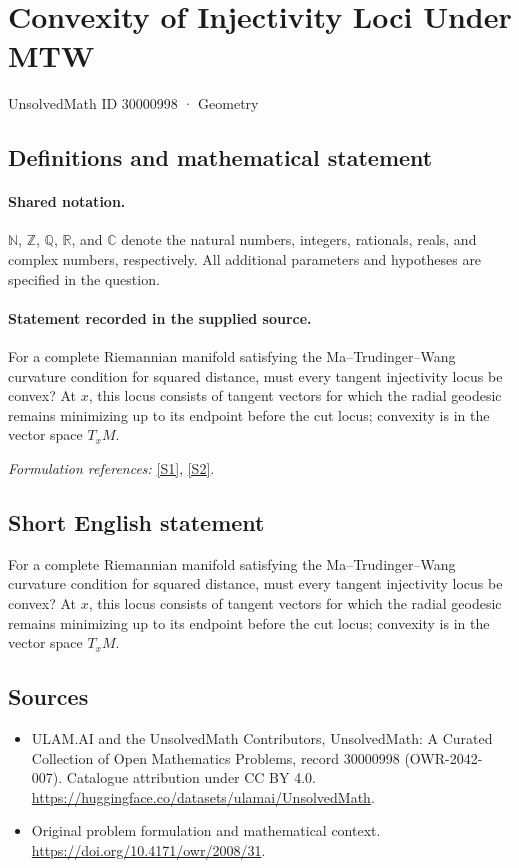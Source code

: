 \documentclass[11pt]{article}
\newcommand{\sref}[2]{\hyperlink{source:#1:#2}{[S#2]}}
\begin{document}
\setcounter{section}{30000997}
\section{Convexity of Injectivity Loci Under MTW}\label{30000998}
{\small UnsolvedMath ID 30000998 · Geometry}
\subsection{Definitions and mathematical statement}

\paragraph{Shared notation.}$\mathbb N$, $\mathbb Z$, $\mathbb Q$, $\mathbb R$, and $\mathbb C$ denote the natural numbers, integers, rationals, reals, and complex numbers, respectively. All additional parameters and hypotheses are specified in the question.


\paragraph{Statement recorded in the supplied source.}
For a complete Riemannian manifold satisfying the Ma--Trudinger--Wang curvature condition for squared distance, must every tangent injectivity locus be convex? At $x$, this locus consists of tangent vectors for which the radial geodesic remains minimizing up to its endpoint before the cut locus; convexity is in the vector space $T_xM$.
\par\smallskip\textit{Formulation references:} \sref{30000998}{1}, \sref{30000998}{2}.
\subsection{Short English statement}
For a complete Riemannian manifold satisfying the Ma--Trudinger--Wang curvature condition for squared distance, must every tangent injectivity locus be convex? At $x$, this locus consists of tangent vectors for which the radial geodesic remains minimizing up to its endpoint before the cut locus; convexity is in the vector space $T_xM$.
\subsection{Sources}
\begin{itemize}
\item[\hypertarget{source:30000998:1}{S1}] ULAM.AI and the UnsolvedMath Contributors, UnsolvedMath: A Curated Collection of Open Mathematics Problems, record 30000998 (OWR-2042-007). Catalogue attribution under CC BY 4.0.
\url{https://huggingface.co/datasets/ulamai/UnsolvedMath}.
\item[\hypertarget{source:30000998:2}{S2}] Original problem formulation and mathematical context.
\url{https://doi.org/10.4171/owr/2008/31}.
\end{itemize}
\label{end:30000998}
\end{document}
